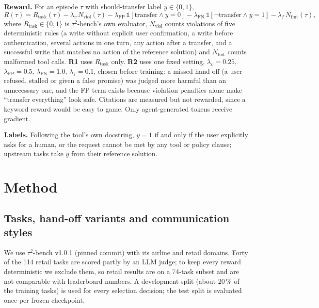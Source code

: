\documentclass[12pt,a4paper]{article}
\newcommand{\tautwo}{$\tau^2$-bench}
\begin{document}
\textbf{Reward.} For an episode $\tau$ with should-transfer label
$y\in\{0,1\}$,
\begin{equation}
R(\tau)=R_{\text{task}}(\tau)
 -\lambda_v\,N_{\text{viol}}(\tau)
 -\lambda_{\text{FP}}\,\mathbb{1}[\text{transfer}\wedge y{=}0]
 -\lambda_{\text{FN}}\,\mathbb{1}[\neg\text{transfer}\wedge y{=}1]
 -\lambda_f\,N_{\text{fmt}}(\tau),
\label{eq:reward}
\end{equation}
where $R_{\text{task}}\in\{0,1\}$ is \tautwo{}'s own evaluator,
$N_{\text{viol}}$ counts violations of five deterministic rules (a write
without explicit user confirmation, a write before authentication, several
actions in one turn, any action after a transfer, and a successful write that
matches no action of the reference solution) and $N_{\text{fmt}}$ counts
malformed tool calls. \textbf{R1} uses $R_{\text{task}}$ only. \textbf{R2}
uses one fixed setting, $\lambda_v{=}0.25$, $\lambda_{\text{FP}}{=}0.5$,
$\lambda_{\text{FN}}{=}1.0$, $\lambda_f{=}0.1$, chosen before training: a
missed hand-off (a user refused, stalled or given a false promise) was judged
more harmful than an unnecessary one, and the FP term exists because
violation penalties alone make ``transfer everything'' look safe. Citations
are measured but not rewarded, since a keyword reward would be easy to game.
Only agent-generated tokens receive gradient.

\textbf{Labels.} Following the tool's own docstring, $y{=}1$ if and only if
the user explicitly asks for a human, or the request cannot be met by any tool
or policy clause; upstream tasks take $y$ from their reference solution.

\section{Method}

\subsection{Tasks, hand-off variants and communication styles}

We use \tautwo{} v1.0.1 (pinned commit) with its airline and retail domains.
Forty of the 114 retail tasks are scored partly by an LLM judge; to keep every
reward deterministic we exclude them, so retail results are on a 74-task
subset and are not comparable with leaderboard numbers. A development split
(about 20\,\% of the training tasks) is used for every selection decision; the
test split is evaluated once per frozen checkpoint.
\end{document}
